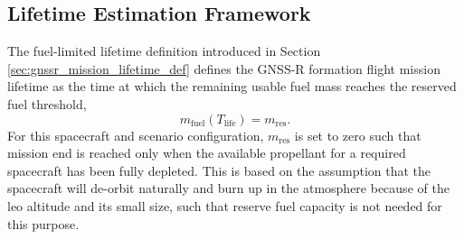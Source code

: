 \subsection{Lifetime Estimation Framework}
\label{sec:lifetime_est_framework}

The fuel-limited lifetime definition introduced in Section \ref{sec:gnssr_mission_lifetime_def} defines the GNSS-R formation flight mission lifetime as the time at which the remaining usable fuel mass reaches the reserved fuel threshold,
\begin{equation}
    m_{\mathrm{fuel}}(T_{\mathrm{life}}) = m_{\mathrm{res}}.
\end{equation}
For this spacecraft and scenario configuration, $m_\mathrm{res}$ is set to zero such that mission end is reached only when the available propellant for a required spacecraft has been fully depleted. This is based on the assumption that the spacecraft will de-orbit naturally and burn up in the atmosphere because of the \gls{leo} altitude and its small size, such that reserve fuel capacity is not needed for this purpose. 

